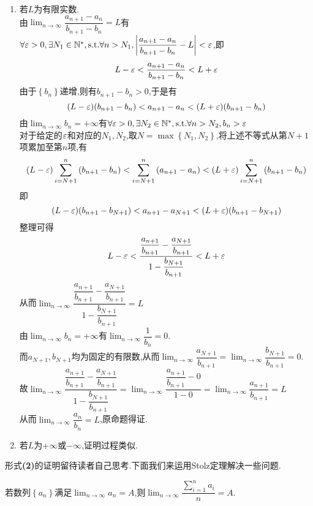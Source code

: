 \documentclass[a4paper]{ctexart}
\begin{document}
\begin{solution}
    \begin{enumerate}[leftmargin=*,label=\textbf{(\alph*)}]
        \item 若$L$为有限实数.\\
            由$\displaystyle\lim_{n\to\infty}{\dfrac{a_{n+1}-a_n}{b_{n+1}-b_n}}=L$有$\forall\varepsilon>0,\exists N_1\in\mathbb{N}^*,\text{s.t.}\forall n>N_1,\left|\dfrac{a_{n+1}-a_n}{b_{n+1}-b_n}-L\right|<\varepsilon$,即
            $$L-\varepsilon<\dfrac{a_{n+1}-a_n}{b_{n+1}-b_n}<L+\varepsilon$$
            由于$\left\{b_n\right\}$递增,则有$b_{n+1}-b_n>0$,于是有
            $$(L-\varepsilon)(b_{n+1}-b_n)<a_{n+1}-a_n<(L+\varepsilon)(b_{n+1}-b_n)$$
            由$\displaystyle\lim_{n\to\infty}{b_n}=+\infty$有$\forall\varepsilon>0,\exists N_2\in\mathbb{N}^*,\text{s.t.}\forall n>N_2,b_n>\varepsilon$\\
            对于给定的$\varepsilon$和对应的$N_1,N_2$,取$N=\max\left\{N_1,N_2\right\}$,将上述不等式从第$N+1$项累加至第$n$项,有
            $$(L-\varepsilon)\sum_{i=N+1}^{n}{(b_{n+1}-b_n)}<\sum_{i=N+1}^{n}{(a_{n+1}-a_n)}<(L+\varepsilon)\sum_{i=N+1}^{n}{(b_{n+1}-b_n)}$$
            即$$(L-\varepsilon)(b_{n+1}-b_{N+1})<a_{n+1}-a_{N+1}<(L+\varepsilon)(b_{n+1}-b_{N+1})$$
            整理可得$$L-\varepsilon<\dfrac{\dfrac{a_{n+1}}{b_{n+1}}-\dfrac{a_{N+1}}{b_{n+1}}}{1-\dfrac{b_{N+1}}{b_{n+1}}}<L+\varepsilon$$
            从而$\displaystyle\lim_{n\to\infty}{\dfrac{\dfrac{a_{n+1}}{b_{n+1}}-\dfrac{a_{N+1}}{b_{n+1}}}{1-\dfrac{b_{N+1}}{b_{n+1}}}}=L$\\
            由$\displaystyle\lim_{n\to\infty}{b_n}=+\infty$有$\displaystyle\lim_{n\to\infty}{\dfrac{1}{b_n}}=0$.\\
            而$a_{N+1},b_{N+1}$均为固定的有限数,从而$\displaystyle\lim_{n\to\infty}{\dfrac{a_{N+1}}{b_{n+1}}}=\lim_{n\to\infty}{\dfrac{b_{N+1}}{b_{n+1}}}=0$.\\
            故$\displaystyle\lim_{n\to\infty}{\dfrac{\dfrac{a_{n+1}}{b_{n+1}}-\dfrac{a_{N+1}}{b_{n+1}}}{1-\dfrac{b_{N+1}}{b_{n+1}}}}=\lim_{n\to\infty}{\dfrac{\dfrac{a_{n+1}}{b_{n+1}}-0}{1-0}}=\lim_{n\to\infty}{\dfrac{a_{n+1}}{b_{n+1}}}=L$\\
            从而$\displaystyle\lim_{n\to\infty}{\dfrac{a_n}{b_n}}=L$,原命题得证.
        \item 若$L$为$+\infty$或$-\infty$,证明过程类似.
    \end{enumerate}
\end{solution}\noindent
形式\textbf{(2)}的证明留待读者自己思考.下面我们来运用Stolz定理解决一些问题.
\begin{formal}
    若数列$\left\{ a_n\right\}$满足$\displaystyle\lim_{n\to\infty}{a_n}=A$,则$\displaystyle\lim_{n\to\infty}{\dfrac{\sum_{i=1}^{n}{a_i}}{n}}=A$.
\end{formal}\noindent
\end{document}
